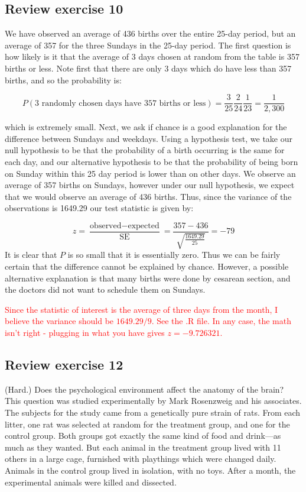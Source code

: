 \documentclass[11pt]{article}
\begin{document}
\subsection*{Review exercise 10} %

We have observed an average of 436 births over the entire 25-day period, but an average of 357 for the three Sundays in the 25-day period. The first question is how likely is it that the average of 3 days chosen at random from the table is 357 births or less. Note first that there are only 3 days which do have less than 357 births, and so the probability is:

$$P(\text{3 randomly chosen days have 357 births or less}) = \frac{3}{25}\frac{2}{24}\frac{1}{23} = \frac{1}{2,300}$$

\noindent which is extremely small. Next, we ask if chance is a good explanation for the difference between Sundays and weekdays. Using a hypothesis test, we take our null hypothesis to be that the probability of a birth occurring is the same for each day, and our alternative hypothesis to be that the probability of being born on Sunday within this 25 day period is lower than on other days. We observe an average of 357 births on Sundays, however under our null hypothesis, we expect that we would observe an average of 436 births. Thus, since the variance of the observations is 1649.29 our test statistic is given by:

$$z = \frac{\text{observed} - \text{expected}}{\text{SE}} = \frac{357 - 436}{\sqrt{\frac{1649.29}{25}}} = -79 $$
It is clear that $P$ is so small that it is essentially zero. Thus we can be fairly certain that the difference cannot be explained by chance. However, a possible alternative explanation is that many births were done by cesarean section, and the doctors did not want to schedule them on Sundays.

\textcolor{red}{ Since the statistic of interest is the average of three days from the month, I believe the variance should be $1649.29/9$.  See the .R file.  In any case, the math isn't right - plugging in what you have gives $z=-9.726321$.} %



\subsection*{Review exercise 12} %
(Hard.) Does the psychological environment affect the anatomy of the brain?
This question was studied experimentally by Mark Rosenzweig and his associates.
The subjects for the study came from a genetically pure strain of rats.
From each litter, one rat was selected at random for the treatment group, and one for the control group.
Both groups got exactly the same kind of food and drink---as much as they wanted.
But each animal in the treatment group lived with 11 others in a large cage, furnished with playthings which were changed daily.
Animals in the control group lived in isolation, with no toys.
After a month, the experimental animals were killed and dissected.
\end{document}

